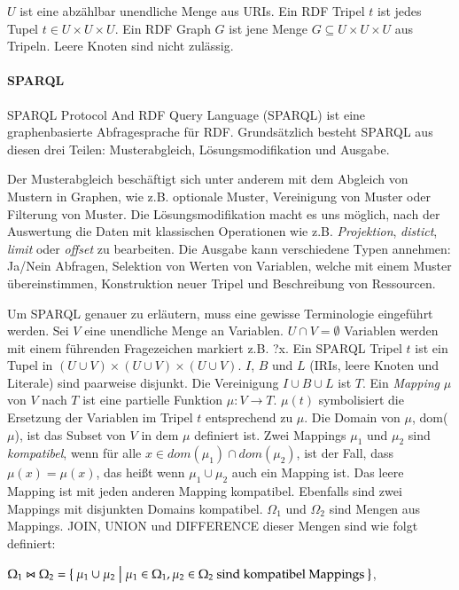 \documentclass[draft,final]{vutinfth} %
\begin{document}
$U$ ist eine abzählbar unendliche Menge aus URIs. Ein RDF Tripel $t$ ist jedes Tupel $t \in U \times U \times U$. Ein RDF Graph $G$ ist jene Menge $G \subseteq U \times U \times U$ aus Tripeln. Leere Knoten sind nicht zulässig. \\ \cite{rdfSite}  

\paragraph{SPARQL}
SPARQL Protocol And RDF Query Language (SPARQL) ist eine graphenbasierte Abfragesprache für RDF. Grundsätzlich besteht SPARQL aus diesen drei Teilen: Musterabgleich, Lösungsmodifikation und Ausgabe.

Der Musterabgleich beschäftigt sich unter anderem mit dem Abgleich von Mustern in Graphen, wie z.B. optionale Muster, Vereinigung von Muster oder Filterung von Muster. Die Lösungsmodifikation macht es uns möglich, nach der Auswertung die Daten mit klassischen Operationen wie z.B. \textit{Projektion}, \textit{distict}, \textit{limit} oder \textit{offset} zu bearbeiten. Die Ausgabe kann verschiedene Typen annehmen: Ja/Nein Abfragen, Selektion von Werten von Variablen, welche mit einem Muster übereinstimmen, Konstruktion neuer Tripel und Beschreibung von Ressourcen.

Um SPARQL genauer zu erläutern, muss eine gewisse Terminologie eingeführt werden.
 Sei $V$ eine unendliche Menge an Variablen. $U \cap V = \emptyset$ Variablen werden mit einem führenden Fragezeichen markiert z.B. ?x. Ein SPARQL Tripel $t$ ist ein Tupel in $(U \cup V) \times (U \cup V) \times (U \cup V)$. $I$, $B$ und $L$ (IRIs, leere Knoten und Literale) sind paarweise disjunkt. Die Vereinigung $I \cup B \cup L$ ist $T$. Ein \textit{Mapping} $\mu$ von $V$ nach $T$ ist eine partielle Funktion $\mu : V \rightarrow T$. $\mu (t)$ symbolisiert die Ersetzung der Variablen im Tripel $t$ entsprechend zu $\mu$. Die Domain von $\mu$, dom($\mu$), ist das Subset von $V$ in dem $\mu$ definiert ist. Zwei Mappings $\mu_1$ und $\mu_2$ sind \textit{kompatibel}, wenn für alle $x \in dom(\mu_1) \cap dom(\mu_2)$, ist der Fall, dass $\mu(x) = \mu(x)$, das hei\ss t wenn $\mu_1 \cup \mu_2$ auch ein Mapping ist. Das leere Mapping ist mit jeden anderen Mapping kompatibel. Ebenfalls sind zwei Mappings mit disjunkten Domains kompatibel. $\Omega_1$ und $\Omega_2$ sind Mengen aus Mappings. JOIN, UNION und DIFFERENCE dieser Mengen sind wie folgt definiert:

 $\Omega_1 \Join \Omega_2 = \Set{ \mu_1 \cup \mu_2 | \mu_1 \in \Omega_1, \mu_2 \in \Omega_2 \ \text{sind kompatibel Mappings} }$,
\end{document}
